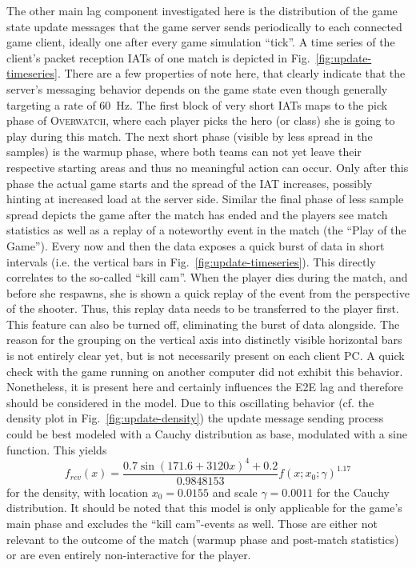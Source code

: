 	The other main lag component investigated here is the distribution of the game state update messages that the game server sends periodically to each connected game client, ideally one after every game simulation ``tick''. A time series of the client's packet reception \glspl{IAT} of one match is depicted in Fig.~\ref{fig:update-timeseries}. There are a few properties of note here, that clearly indicate that the server's messaging behavior depends on the game state even though generally targeting a rate of \SI{60}{\hertz}. The first block of very short \glspl{IAT} maps to the pick phase of \textsc{Overwatch}, where each player picks the hero (or class) she is going to play during this match. The next short phase (visible by less spread in the samples) is the warmup phase, where both teams can not yet leave their respective starting areas and thus no meaningful action can occur. Only after this phase the actual game starts and the spread of the \gls{IAT} increases, possibly hinting at increased load at the server side. Similar the final phase of less sample spread depicts the game after the match has ended and the players see match statistics as well as a replay of a noteworthy event in the match (the ``Play of the Game''). Every now and then the data exposes a quick burst of data in short intervals (i.e. the vertical bars in Fig.~\ref{fig:update-timeseries}). This directly correlates to the so-called ``kill cam''. When the player dies during the match, and before she respawns, she is shown a quick replay of the event from the perspective of the shooter. Thus, this replay data needs to be transferred to the player first. This feature can also be turned off, eliminating the burst of data alongside.	The reason for the grouping on the vertical axis into distinctly visible horizontal bars is not entirely clear yet, but is not necessarily present on each client PC. A quick check with the game running on another computer did not exhibit this behavior. Nonetheless, it is present here and certainly influences the \gls{E2E} lag and therefore should be considered in the model. Due to this oscillating behavior (cf. the density plot in Fig.~\ref{fig:update-density}) the update message sending process could be best modeled with a Cauchy distribution as base, modulated with a sine function. This yields
	\begin{equation*}
		f_{rcv}(x) = \frac{0.7\sin(171.6 +3120x)^4 + 0.2}{0.9848153} f(x; x_0; \gamma)^{1.17} 
	\end{equation*}
	for the density, with location $x_0 = 0.0155$ and scale $\gamma = 0.0011$ for the Cauchy distribution. It should be noted that this model is only applicable for the game's main phase and excludes the ``kill cam''-events as well. Those are either not relevant to the outcome of the match (warmup phase and post-match statistics) or are even entirely non-interactive for the player.






